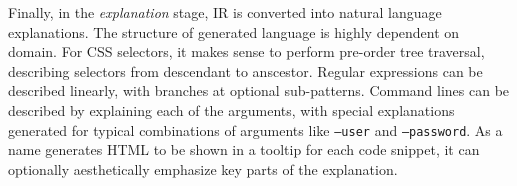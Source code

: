 Finally, in the \emph{explanation} stage, IR is converted into natural language explanations.
The structure of generated language is highly dependent on domain.
For CSS selectors, it makes sense to perform pre-order tree traversal, describing selectors from descendant to anscestor.
Regular expressions can be described linearly, with branches at optional sub-patterns.
Command lines can be described by explaining each of the arguments, with special explanations generated for typical combinations of arguments like \texttt{--user} and \texttt{--password}.
As a \gls{name} generates HTML to be shown in a tooltip for each code snippet, it can optionally aesthetically emphasize key parts of the explanation.
